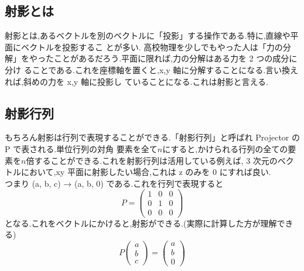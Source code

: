 \subsection{射影とは}
射影とは,あるベクトルを別のベクトルに「投影」する操作である.特に,直線や平面にベクトルを投影するこ
とが多い.
高校物理を少しでもやった人は「力の分解」をやったことがあるだろう.平面に限れば,力の分解はある力を 2 つの成分に分け
ることである.これを座標軸を置くと,x,y 軸に分解することになる.言い換えれば,斜めの力を x,y 軸に投影し
ていることになる.これは射影と言える.
\subsection{射影行列}
もちろん射影は行列で表現することができる.「射影行列」と呼ばれ Projector の P で表される.単位行列の対角
要素を全て$n$にすると,かけられる行列の全ての要素を$n$倍することができる.これを射影行列は活用している例えば,
3 次元のベクトルにおいて,xy 平面に射影したい場合,これは z のみを 0 にすれば良い.\\つまり (a, b, c) → (a, b, 0)
である.これを行列で表現すると
\[
P=\begin{pmatrix}
    1 & 0 & 0 \\ 0 & 1 & 0 \\ 0 & 0 & 0
\end{pmatrix}
\]
となる.これをベクトルにかけると,射影ができる.(実際に計算した方が理解できる)
\[
P
\begin{pmatrix}
    a \\ b \\ c
\end{pmatrix}=
\begin{pmatrix}
    a \\ b \\ 0
\end{pmatrix}\]
